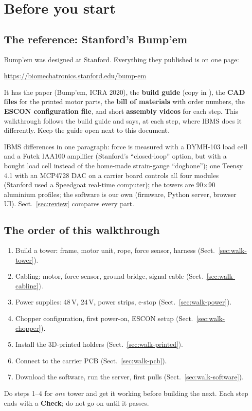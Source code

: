 \section{Before you start}\label{sec:start}

\subsection{The reference: Stanford's Bump'em}
Bump'em was designed at Stanford. Everything they published is on one page:
\begin{center}
\url{https://biomechatronics.stanford.edu/bump-em}
\end{center}
It has the paper (Bump'em, ICRA 2020), the \textbf{build guide} (copy in
), the \textbf{CAD files} for the printed motor parts,
the \textbf{bill of materials} with order numbers, the \textbf{ESCON configuration file}, and short
\textbf{assembly videos} for each step. This walkthrough follows the build guide and says, at each step,
where IBMS does it differently. Keep the guide open next to this document.

IBMS differences in one paragraph: force is measured with a DYMH-103 load cell and a Futek IAA100
amplifier (Stanford's ``closed-loop'' option, but with a bought load cell instead of the home-made strain-gauge
``dogbone''); one Teensy 4.1 with an MCP4728 DAC on a carrier board controls all four modules (Stanford
used a Speedgoat real-time computer); the towers are 90$\times$90 aluminium profiles; the software is our own
(firmware, Python server, browser UI). Sect.~\ref{sec:review} compares every part.

\subsection{The order of this walkthrough}
\begin{enumerate}
\item Build a tower: frame, motor unit, rope, force sensor, harness (Sect.~\ref{sec:walk-tower}).
\item Cabling: motor, force sensor, ground bridge, signal cable (Sect.~\ref{sec:walk-cabling}).
\item Power supplies: 48\,V, 24\,V, power strips, e-stop (Sect.~\ref{sec:walk-power}).
\item Chopper configuration, first power-on, ESCON setup (Sect.~\ref{sec:walk-chopper}).
\item Install the 3D-printed holders (Sect.~\ref{sec:walk-printed}).
\item Connect to the carrier PCB (Sect.~\ref{sec:walk-pcb}).
\item Download the software, run the server, first pulls (Sect.~\ref{sec:walk-software}).
\end{enumerate}
Do steps 1--4 for \emph{one} tower and get it working before building the next. Each step ends with a
\textbf{Check}; do not go on until it passes.

